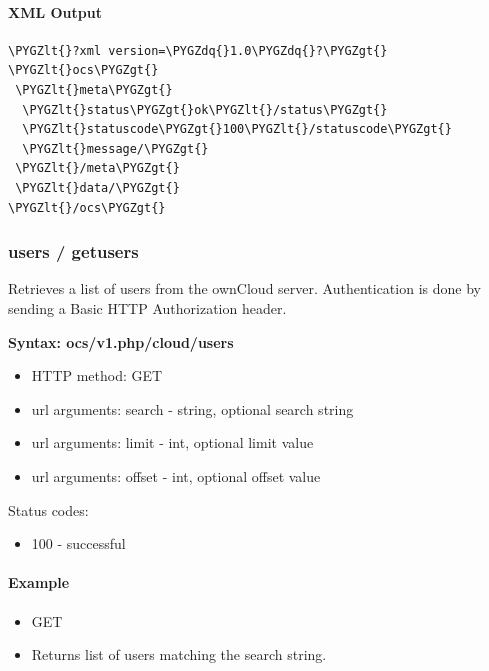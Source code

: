 \documentclass[letterpaper,10pt,english]{sphinxmanual}
\def\PYGZlt{\char`\<}
\def\PYGZgt{\char`\>}
\def\PYGZdq{\char`\"}
\begin{document}
\paragraph{XML Output}
\label{configuration_user/user_provisioning_api:xml-output}
\begin{Verbatim}[commandchars=\\\{\}]
\PYGZlt{}?xml version=\PYGZdq{}1.0\PYGZdq{}?\PYGZgt{}
\PYGZlt{}ocs\PYGZgt{}
 \PYGZlt{}meta\PYGZgt{}
  \PYGZlt{}status\PYGZgt{}ok\PYGZlt{}/status\PYGZgt{}
  \PYGZlt{}statuscode\PYGZgt{}100\PYGZlt{}/statuscode\PYGZgt{}
  \PYGZlt{}message/\PYGZgt{}
 \PYGZlt{}/meta\PYGZgt{}
 \PYGZlt{}data/\PYGZgt{}
\PYGZlt{}/ocs\PYGZgt{}
\end{Verbatim}


\subsubsection{\textbf{users / getusers}}
\label{configuration_user/user_provisioning_api:users-getusers}
Retrieves a list of users from the ownCloud server. Authentication is done by
sending a Basic HTTP Authorization header.

\textbf{Syntax: ocs/v1.php/cloud/users}
\begin{itemize}
\item {} 
HTTP method: GET

\item {} 
url arguments: search - string, optional search string

\item {} 
url arguments: limit - int, optional limit value

\item {} 
url arguments: offset - int, optional offset value

\end{itemize}

Status codes:
\begin{itemize}
\item {} 
100 - successful

\end{itemize}


\paragraph{Example}
\label{configuration_user/user_provisioning_api:id1}\begin{itemize}
\item {} 
GET 

\item {} 
Returns list of users matching the search string.

\end{itemize}
\end{document}
